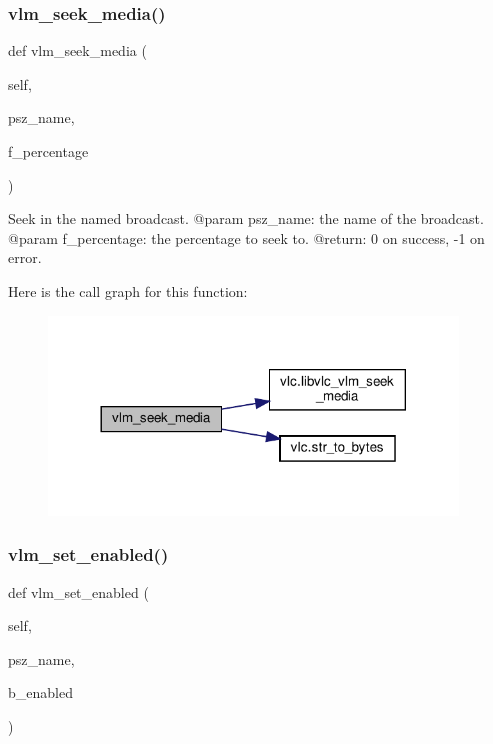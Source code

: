 \subsubsection{\texorpdfstring{vlm\+\_\+seek\+\_\+media()}{vlm\_seek\_media()}}
{\footnotesize\ttfamily def vlm\+\_\+seek\+\_\+media (\begin{DoxyParamCaption}\item[{}]{self,  }\item[{}]{psz\+\_\+name,  }\item[{}]{f\+\_\+percentage }\end{DoxyParamCaption})}

\begin{DoxyVerb}Seek in the named broadcast.
@param psz_name: the name of the broadcast.
@param f_percentage: the percentage to seek to.
@return: 0 on success, -1 on error.
\end{DoxyVerb}
 Here is the call graph for this function\+:
\nopagebreak
\begin{figure}[H]
\begin{center}
\leavevmode
\includegraphics[width=308pt]{classvlc_1_1_instance_a507fdd00d3a2be49e8336ea77a7fe315_cgraph}
\end{center}
\end{figure}
\mbox{\label{classvlc_1_1_instance_a1096326419fe3760417950781576f535}} 
\subsubsection{\texorpdfstring{vlm\+\_\+set\+\_\+enabled()}{vlm\_set\_enabled()}}
{\footnotesize\ttfamily def vlm\+\_\+set\+\_\+enabled (\begin{DoxyParamCaption}\item[{}]{self,  }\item[{}]{psz\+\_\+name,  }\item[{}]{b\+\_\+enabled }\end{DoxyParamCaption})}

